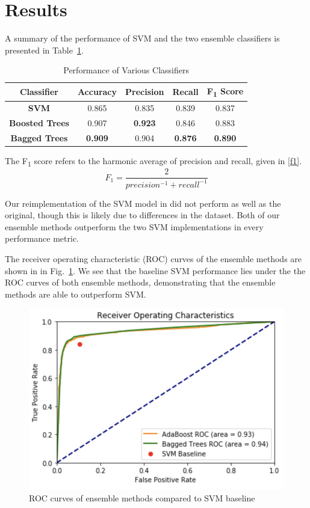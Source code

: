 \documentclass[conference]{IEEEtran}
\begin{document}
\section{Results}
A summary of the performance of SVM and the two ensemble classifiers is presented in Table~\ref{restab}.
\begin{table}[htbp]
\caption{Performance of Various Classifiers}
\begin{center}
\begin{tabular}{ccccc}
\textbf{Classifier}&\textbf{Accuracy}&\textbf{Precision}&\textbf{Recall}&\textbf{F\textsubscript{1} Score} \\
\hline
\textbf{SVM} & 0.865 & 0.835 & 0.839 & 0.837 \\
\textbf{Boosted Trees} & 0.907 & \textbf{0.923} & 0.846 & 0.883 \\
\textbf{Bagged Trees} & \textbf{0.909} & 0.904 & \textbf{0.876} & \textbf{0.890} \\
\end{tabular}
\label{restab}
\end{center}
\end{table}
The F\textsubscript{1} score refers to the harmonic average of precision and recall, given in \eqref{f1}.
\begin{equation}
F_1 = \frac{2}{precision^{-1} + recall^{-1}}\label{f1}
\end{equation}

Our reimplementation of the SVM model in \cite{Marafino} did not perform as well as the original, though this is likely due to differences in the dataset. Both of our ensemble methods outperform the two SVM implementations in every performance metric. 

The receiver operating characteristic (ROC) curves of the ensemble methods are shown in in Fig.~\ref{roc}. We see that the baseline SVM performance lies under the the ROC curves of both ensemble methods, demonstrating that the ensemble methods are able to outperform SVM. 
\begin{figure}[htbp]
\centerline{\includegraphics[scale=0.6]{roc}}
\caption{ROC curves of ensemble methods compared to SVM baseline}
\label{roc}
\end{figure}
\end{document}
